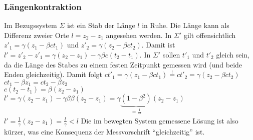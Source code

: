 \subsubsection{Längenkontraktion}
Im Bezugssystem $\Sigma$ ist ein Stab der Länge $l$ in Ruhe. Die Länge kann als Differenz zweier Orte $l = z_2 - z_1$ angesehen werden. In $\Sigma'$ gilt offensichtlich $z'_1 = \gamma (z_1 - \beta c t_1)$ und $z'_2 = \gamma (z_2 - \beta c t_2)$. Damit ist $l' = z'_2 - z'_1 = \gamma (z_2 - z_1) - \gamma \beta c (t_2 - t_1)$.
In $\Sigma'$ sollen $t'_1$ und $t'_2$ gleich sein, da die Länge des Stabes zu einem festen Zeitpunkt gemessen wird (und beide Enden gleichzeitig). Damit folgt
$c t'_1 = \gamma (z_1 - \beta c t_1) \overset{!}{=} c t'_2 = \gamma (z_2 - \beta c t_2)$\\
\conseq $c t_1 - \beta z_1 = c t_2 - \beta z_2$ \\ $c(t_2 - t_1) = \beta (z_2 - z_1)$\\
\conseq $l' = \gamma (z_2 - z_1) - \gamma \beta \beta (z_2 - z_1) = \gamma \underbrace{(1 - \beta^2)}_{=\frac{1}{\gamma^2}} (z_2 - z_1)$
\conseq $l' = \frac{1}{\gamma} (z_2 - z_1) = \frac{l}{\gamma} < l$
Die im bewegten System gemessene Lösung ist also kürzer, was eine Konsequenz der Messvorschrift "`gleichzeitig"' ist.

